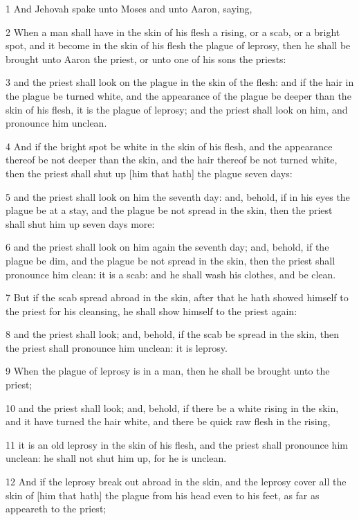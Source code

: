 \par 1 And Jehovah spake unto Moses and unto Aaron, saying,
\par 2 When a man shall have in the skin of his flesh a rising, or a scab, or a bright spot, and it become in the skin of his flesh the plague of leprosy, then he shall be brought unto Aaron the priest, or unto one of his sons the priests:
\par 3 and the priest shall look on the plague in the skin of the flesh: and if the hair in the plague be turned white, and the appearance of the plague be deeper than the skin of his flesh, it is the plague of leprosy; and the priest shall look on him, and pronounce him unclean.
\par 4 And if the bright spot be white in the skin of his flesh, and the appearance thereof be not deeper than the skin, and the hair thereof be not turned white, then the priest shall shut up [him that hath] the plague seven days:
\par 5 and the priest shall look on him the seventh day: and, behold, if in his eyes the plague be at a stay, and the plague be not spread in the skin, then the priest shall shut him up seven days more:
\par 6 and the priest shall look on him again the seventh day; and, behold, if the plague be dim, and the plague be not spread in the skin, then the priest shall pronounce him clean: it is a scab: and he shall wash his clothes, and be clean.
\par 7 But if the scab spread abroad in the skin, after that he hath showed himself to the priest for his cleansing, he shall show himself to the priest again:
\par 8 and the priest shall look; and, behold, if the scab be spread in the skin, then the priest shall pronounce him unclean: it is leprosy.
\par 9 When the plague of leprosy is in a man, then he shall be brought unto the priest;
\par 10 and the priest shall look; and, behold, if there be a white rising in the skin, and it have turned the hair white, and there be quick raw flesh in the rising,
\par 11 it is an old leprosy in the skin of his flesh, and the priest shall pronounce him unclean: he shall not shut him up, for he is unclean.
\par 12 And if the leprosy break out abroad in the skin, and the leprosy cover all the skin of [him that hath] the plague from his head even to his feet, as far as appeareth to the priest;
